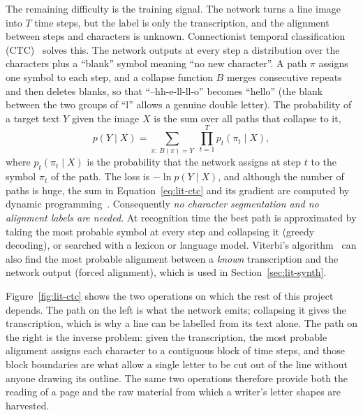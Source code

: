 The remaining difficulty is the training signal. The network turns a line image into $T$ time steps, but the label is only the transcription, and the alignment between steps and characters is unknown. Connectionist temporal classification (CTC)~\cite{graves2006} solves this. The network outputs at every step a distribution over the characters plus a ``blank'' symbol meaning ``no new character''. A path $\pi$ assigns one symbol to each step, and a collapse function $B$ merges consecutive repeats and then deletes blanks, so that ``--hh-e-ll-ll-o'' becomes ``hello'' (the blank between the two groups of ``l'' allows a genuine double letter). The probability of a target text $Y$ given the image $X$ is the sum over all paths that collapse to it,
\begin{equation}
p(Y\mid X)=\sum_{\pi:\,B(\pi)=Y}\;\prod_{t=1}^{T}p_t(\pi_t\mid X),
\label{eq:lit-ctc}
\end{equation}
where $p_t(\pi_t\mid X)$ is the probability that the network assigns at step $t$ to the symbol $\pi_t$ of the path. The loss is $-\ln p(Y\mid X)$, and although the number of paths is huge, the sum in Equation~\ref{eq:lit-ctc} and its gradient are computed by dynamic programming~\cite{graves2006}. Consequently \emph{no character segmentation and no alignment labels are needed}. At recognition time the best path is approximated by taking the most probable symbol at every step and collapsing it (greedy decoding), or searched with a lexicon or language model. Viterbi's algorithm~\cite{viterbi1967} can also find the most probable alignment between a \emph{known} transcription and the network output (forced alignment), which is used in Section~\ref{sec:lit-synth}.

Figure~\ref{fig:lit-ctc} shows the two operations on which the rest of this project depends. The path on the left is what the network emits; collapsing it gives the transcription, which is why a line can be labelled from its text alone. The path on the right is the inverse problem: given the transcription, the most probable alignment assigns each character to a contiguous block of time steps, and those block boundaries are what allow a single letter to be cut out of the line without anyone drawing its outline. The same two operations therefore provide both the reading of a page and the raw material from which a writer's letter shapes are harvested.

